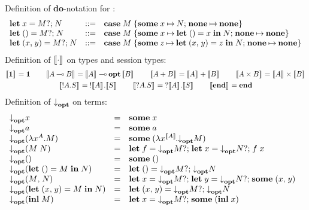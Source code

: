 \begin{figure*}
  \begin{mdframed}\begin{highlight}
    Definition of \textbf{do}-notation for \affineAGV:%
    \[
      \begin{array}{lcl}
        \gvDo{x}{M}{N} &::=& \gvDoDef{x}{M}{N}
        \\
        \gvDo{\gvUnit}{M}{N} &::=& \gvDoDef{x}{M}{\gvLetUnit{x}{N}}
        \\
        \gvDo{\gvPair{x}{y}}{M}{N} &::=& \gvDoDef{z}{M}{\gvLetPair{x}{y}{z}{N}}
      \end{array}
    \] 
    Definition of $\ftm{\cdot}$ on types and session types:%
    \begin{gather*}
      \ftm{\gvTyUnit}         = \gvTyUnit
      \qquad
      \ftm{{\gvTyFun{A}{B}}}  = \gvTyFun{\ftm{A}}{\gvTyOpt{\ftm{B}}}
      \qquad
      \ftm{{\gvTySum{A}{B}}}  = \gvTySum{\ftm{A}}{\ftm{B}}
      \qquad
      \ftm{{\gvTyPair{A}{B}}} = \gvTyPair{\ftm{A}}{\ftm{B}}
      \\
      \ftm{{\gvTySend{A}{S}}} = \gvTySend{\ftm{A}}{\ftm{S}}
      \qquad
      \ftm{{\gvTyRecv{A}{S}}} = \gvTyRecv{\ftm{A}}{\ftm{S}}
      \qquad
      \ftm{\gvTyEnd}          = \gvTyEnd
    \end{gather*}
    Definition of $\atm{}$ on terms:%
    \[
      \begin{array}{lcl}
        \atm{\tm{x}}
        & = & \gvSome{\tm{x}}
        \\
        \atm{\tm{a}}
        & = & \gvSome{\tm{a}}
        \\
        \atm{\parens{\gvAbs[A]{x}{M}}}
        & = & \gvSome{\parens{\gvAbs[\ftm{A}]{x}{\atm{M}}}}
        \\
        \atm{\parens{\gvApp{M}{N}}}
        & = & \gvDo{f}{\atm{M}}{{\gvDo{x}{\atm{N}}{\gvApp{f}{x}}}}
        \\
        \atm{\gvUnit}
        & = & \gvSome{\gvUnit}
        \\
        \atm{\parens{\gvLetUnit{M}{N}}}
        & = & \gvDo{\gvUnit}{\atm{M}}{{\atm{N}}}
        \\
        \atm{\gvPair{M}{N}}
        & = & \gvDo{x}{\atm{M}}{{\gvDo{y}{\atm{N}}{{\gvSome{\gvPair{x}{y}}}}}}
        \\
        \atm{\parens{\gvLetPair{x}{y}{M}{N}}}
        & = & \gvDo{\gvPair{x}{y}}{\atm{M}}{\atm{N}}
        \\
        \atm{\parens{\gvInl{M}}}
        & = & \gvDo{x}{\atm{M}}{\gvSome{\parens{\gvInl{x}}}}

\end{array}\]
\end{highlight}
\end{mdframed}
\end{figure*}
